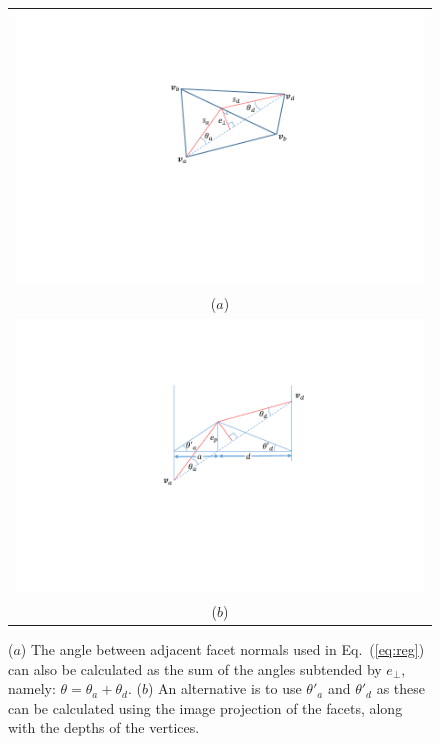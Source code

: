 \begin{figure}
\begin{center}
\begin{tabular}{c}
   \includegraphics[trim=140 110 130 70,clip,width=0.6\linewidth]{Figures/adjacentFacets} \\
   ($a$) \\
   \includegraphics[trim=140 110 140 80,clip,width=0.65\linewidth]{Figures/adjacentApprox} \\
   ($b$) \\
\end{tabular}
\end{center}
   \caption{($a$) The angle between adjacent facet normals used in Eq.~(\ref{eq:reg}) can also be calculated as the sum of the angles subtended by $e_\perp$, namely: $\theta = \theta_a+\theta_d$. ($b$) An alternative is to use $\theta'_a$  and $\theta'_d$ as these can be calculated using the image projection of the facets, along with the depths of the vertices. }
\label{fig:regularization}
\end{figure}

